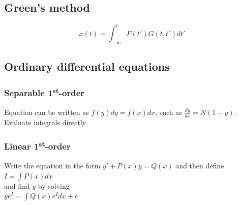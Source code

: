 \documentclass[letterpaper,landscape,10pt]{article}
\begin{document}
{\begin{multicols}{4}
	\subsection*{Green's method}
		$$
			x(t) = \int_{-\infty}^{t}F(t')G(t,t')dt'
		$$
	
	\subsection*{Ordinary differential equations}
		\subsubsection*{Separable 1\textsuperscript{st}-order}
			Equation can be written as $f(y)dy = f(x)dx$, such as
			$\frac{dy}{dx} = N(1-y)$.  Evaluate integrals directly.

		\subsubsection*{Linear 1\textsuperscript{st}-order}%
			Write the equation in the form $ y' + P(x)y = Q(x) $ and then
			define\\
			{\centering $ I = \int P(x)dx $\\}
			and find $y$ by solving \\
			{\centering $ ye^{I} = \int Q(x)e^{I}dx+c $\\}



\end{multicols}}
\end{document}
